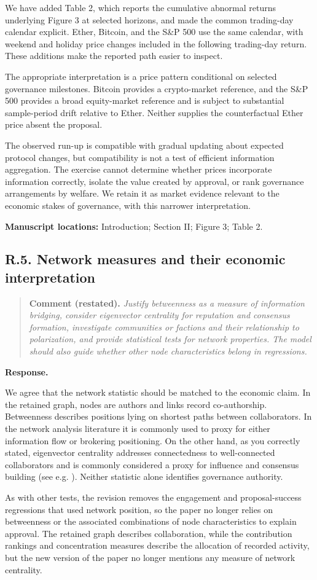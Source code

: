 \documentclass[11pt,letterpaper]{article}
\newcommand{\point}[3]{%
  \Needspace{7\baselineskip}
  \subsection*{#1. #2}\phantomsection\label{pt:#1}%
  \begin{quote}\small\textbf{Comment (restated).} \textit{#3}\end{quote}%
  \textbf{Response.}\enspace\ignorespaces}
\newcommand{\locations}[1]{\par{\small\textbf{Manuscript locations:} #1.}\par}
\begin{document}
We have added Table 2, which reports the cumulative abnormal returns underlying Figure 3 at selected horizons, and made the common trading-day calendar explicit. Ether, Bitcoin, and the S\&P 500 use the same calendar, with weekend and holiday price changes included in the following trading-day return. These additions make the reported path easier to inspect. 

The appropriate interpretation is a price pattern conditional on selected governance milestones. Bitcoin provides a crypto-market reference, and the S\&P 500 provides a broad equity-market reference and is subject to substantial sample-period drift relative to Ether. Neither supplies the counterfactual Ether price absent the proposal. 

The observed run-up is compatible with gradual updating about expected protocol changes, but compatibility is not a test of efficient information aggregation. The exercise cannot determine whether prices incorporate information correctly, isolate the value created by approval, or rank governance arrangements by welfare. We retain it as market evidence relevant to the economic stakes of governance, with this narrower interpretation.

\locations{Introduction; Section II; Figure 3; Table 2}

\point{R.5}{Network measures and their economic interpretation}{Justify betweenness as a measure of information bridging, consider eigenvector centrality for reputation and consensus formation, investigate communities or factions and their relationship to polarization, and provide statistical tests for network properties. The model should also guide whether other node characteristics belong in regressions.}

We agree that the network statistic should be matched to the economic claim. In the retained graph, nodes are authors and links record co-authorship. Betweenness describes positions lying on shortest paths between collaborators. In the network analysis literature it is commonly used to proxy for either information flow or brokering positioning. On the other hand, as you correctly stated, eigenvector centrality addresses connectedness to well-connected collaborators and is commonly considered a proxy for influence and consensus building (see e.g. \cite{WassermanFaust1994}). Neither statistic alone identifies governance authority.

As with other tests, the revision removes the engagement and proposal-success regressions that used network position, so the paper no longer relies on betweenness or the associated combinations of node characteristics to explain approval. The retained graph describes collaboration, while the contribution rankings and concentration measures describe the allocation of recorded activity, but the new version of the paper no longer mentions any measure of network centrality.
\end{document}
